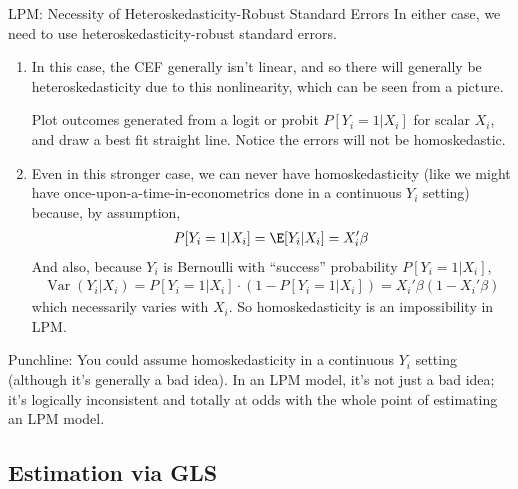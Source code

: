 \documentclass[aspectratio=169, handout]{beamer}
\newcommand{\Var}{\operatorname{Var}}
\begin{document}
{\scriptsize
\begin{frame}{LPM: Necessity of Heteroskedasticity-Robust Standard Errors}
In \alert{either} case, we need to use heteroskedasticity-robust
standard errors.
\begin{enumerate}
  \item
    In this case, the CEF generally isn't linear, and so there will
    generally be \alert{heteroskedasticity} due to this nonlinearity,
    which can be seen from a picture.

    Plot outcomes generated from a logit or probit
    $P[Y_i=1|X_i]$ for scalar $X_i$, and draw a best fit straight line.
    Notice the errors will not be homoskedastic.

  \item Even in this stronger case, we can never have homoskedasticity
    (like we might have once-upon-a-time-in-econometrics done in
    a continuous $Y_i$ setting) because, by assumption,
    \begin{align*}
      P[Y_i=1|X_i]
      =
      \E[Y_i|X_i]
      =
      X_i'\beta
    \end{align*}
    And also, because $Y_i$ is Bernoulli with ``success'' probability
    $P[Y_i=1|X_i]$,
    \begin{align*}
      \Var(Y_i|X_i)
      =
      P[Y_i=1|X_i]
      \cdot
      (1- P[Y_i=1|X_i])
      =
      X_i'\beta
      (1-X_i'\beta)
    \end{align*}
    which necessarily varies with $X_i$.
    So homoskedasticity is an \alert{impossibility} in LPM.
\end{enumerate}
Punchline:
You \alert{could} assume homoskedasticity in a continuous $Y_i$ setting
(although it's generally a bad idea).
In an LPM model, it's not just a bad idea; it's logically inconsistent
and totally at odds with the whole point of estimating an LPM model.
\end{frame}
}


\subsection{Estimation via GLS}
\end{document}
